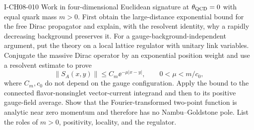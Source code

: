 \begin{exercise}{I-CH08-010}
Work in four-dimensional Euclidean signature at $\theta_{\rm QCD}=0$ with equal quark mass
$m>0$.  First obtain the large-distance exponential bound for the free Dirac
propagator and explain, with the resolvent identity, why a rapidly decreasing
background preserves it.  For a gauge-background-independent argument, put
the theory on a local lattice regulator with unitary link variables.  Conjugate
the massive Dirac operator by an exponential position weight and use a
resolvent estimate to prove
\[
 \lVert S_A(x,y)\rVert\le C_m\ee^{-\mu|x-y|},
 \qquad 0<\mu<m/c_0,
\]
where $C_m,c_0$ do not depend on the gauge configuration.  Apply the bound to
the connected flavor-nonsinglet vector-current integrand and then to its
positive gauge-field average.
Show that the Fourier-transformed two-point function is analytic near zero
momentum and therefore has no Nambu--Goldstone pole.  List the roles of
$m>0$, positivity, locality, and the regulator.
\end{exercise}
